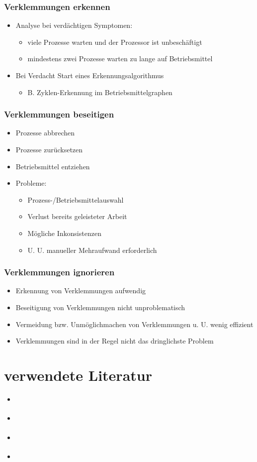\documentclass[11pt]{article}
\begin{document}
\subsubsection*{Verklemmungen erkennen}
\label{sec:org1790965}
\begin{itemize}
\item Analyse bei verdächtigen Symptomen:
\begin{itemize}
\item viele Prozesse warten und der Prozessor ist unbeschäftigt
\item mindestens zwei Prozesse warten zu lange auf Betriebsmittel
\end{itemize}
\item Bei Verdacht Start eines Erkennungsalgorithmus
\begin{itemize}
\item B. Zyklen-Erkennung im Betriebsmittelgraphen
\end{itemize}
\end{itemize}
\subsubsection*{Verklemmungen beseitigen}
\label{sec:orga2adda9}
\begin{itemize}
\item Prozesse abbrechen
\item Prozesse zurücksetzen
\item Betriebsmittel entziehen
\item Probleme: 
\begin{itemize}
\item Prozess-/Betriebsmittelauswahl
\item Verlust bereits geleisteter Arbeit
\item Mögliche Inkonsistenzen
\item U. U. manueller Mehraufwand erforderlich
\end{itemize}
\end{itemize}
\subsubsection*{Verklemmungen ignorieren}
\label{sec:org822906e}
\begin{itemize}
\item Erkennung von Verklemmungen aufwendig
\item Beseitigung von Verklemmungen nicht unproblematisch
\item Vermeidung bzw. Unmöglichmachen von Verklemmungen u. U. wenig effizient
\item Verklemmungen sind in der Regel nicht das dringlichste Problem
\end{itemize}
\section*{verwendete Literatur}
\label{sec:org904c20a}
\begin{itemize}
\item \cite{Bengel2015}
\item \cite{CACM2017}
\item \cite{CACM2016}
\item \cite{Subramanian2017}
\end{itemize}
\section*{}
\label{sec:org2820991}
\end{document}
